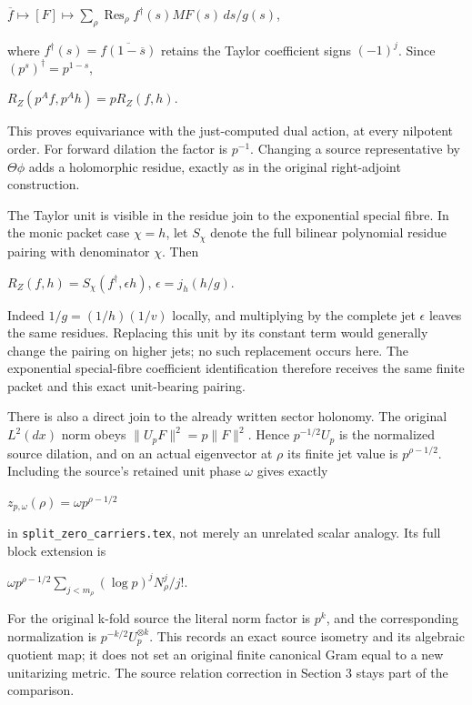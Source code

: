 \documentclass{article}
\begin{document}
\(\overline f\mapsto [F]\mapsto\sum_\rho\operatorname{Res}_\rho f^\dagger(s)MF(s)\,ds/g(s)\),

where \(f^\dagger(s)=\overline{f(1-\overline{s})}\) retains the Taylor coefficient signs \((-1)^j\). Since \((p^s)^\dagger=p^{1-s}\),

\(R_Z(p^A f,p^A h)=p R_Z(f,h)\).

This proves equivariance with the just-computed dual action, at every nilpotent order. For forward dilation the factor is \(p^{-1}\). Changing a source representative by \(\Theta \phi\) adds a holomorphic residue, exactly as in the original right-adjoint construction.

The Taylor unit is visible in the residue join to the exponential special fibre. In the monic packet case \(\chi=h\), let \(S_\chi\) denote the full bilinear polynomial residue pairing with denominator \(\chi\). Then

\(R_Z(f,h)=S_\chi(f^\dagger,\epsilon h)\), \(\epsilon=j_h(h/g)\).

Indeed \(1/g=(1/h)(1/v)\) locally, and multiplying by the complete jet \(\epsilon\) leaves the same residues. Replacing this unit by its constant term would generally change the pairing on higher jets; no such replacement occurs here. The exponential special-fibre coefficient identification therefore receives the same finite packet and this exact unit-bearing pairing.

There is also a direct join to the already written sector holonomy. The original \(L^2(dx)\) norm obeys \(\lVert U_pF\rVert^2=p\lVert F\rVert^2\). Hence \(p^{-1/2}U_p\) is the normalized source dilation, and on an actual eigenvector at \(\rho\) its finite jet value is \(p^{\rho-1/2}\). Including the source's retained unit phase \(\omega\) gives exactly

\(z_{p,\omega}(\rho)=\omega p^{\rho-1/2}\)

in \nolinkurl{split_zero_carriers.tex}, not merely an unrelated scalar analogy. Its full block extension is

\(\omega p^{\rho-1/2} \sum_{j<m_\rho}(\log p)^j N_\rho^j/j!\).

For the original k-fold source the literal norm factor is \(p^k\), and the corresponding normalization is \(p^{-k/2}U_p^{\otimes k}\). This records an exact source isometry and its algebraic quotient map; it does not set an original finite canonical Gram equal to a new unitarizing metric. The source relation correction in Section 3 stays part of the comparison.
\end{document}
